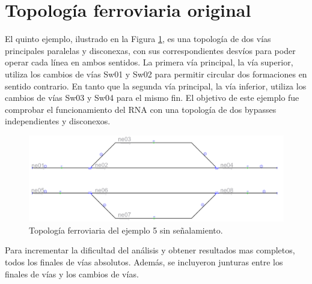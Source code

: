 \section{Topología ferroviaria original}

	El quinto ejemplo, ilustrado en la Figura \ref{fig:EJ5_1}, es una topología de dos vías principales paralelas y disconexas, con sus correspondientes desvíos para poder operar cada línea en ambos sentidos. La primera vía principal, la vía superior, utiliza los cambios de vías Sw01 y Sw02 para permitir circular dos formaciones en sentido contrario. En tanto que la segunda vía principal, la vía inferior, utiliza los cambios de vías Sw03 y Sw04 para el mismo fin. El objetivo de este ejemplo fue comprobar el funcionamiento del RNA con una topología de dos bypasses independientes y disconexos.
	
	\begin{figure}[h]
		\centering
		\includegraphics[width=1\textwidth]{resultados-obtenidos/ejemplo5/images/5_empty.png}
		\centering\caption{Topología ferroviaria del ejemplo 5 sin señalamiento.}
		\label{fig:EJ5_1}
	\end{figure}
	
	Para incrementar la dificultad del análisis y obtener resultados mas completos, todos los finales de vías absolutos. Además, se incluyeron junturas entre los finales de vías y los cambios de vías.
